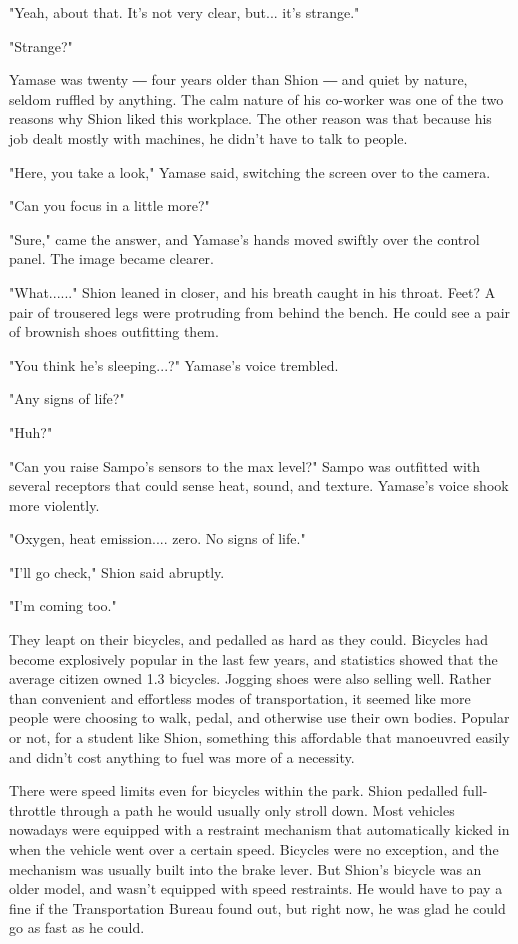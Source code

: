 "Yeah, about that. It's not very clear, but... it's strange."

"Strange?"

Yamase was twenty ― four years older than Shion ― and quiet by nature,
seldom ruffled by anything. The calm nature of his co-worker was one of
the two reasons why Shion liked this workplace. The other reason was
that because his job dealt mostly with machines, he didn't have to talk
to people.

"Here, you take a look," Yamase said, switching the screen over to the
camera.

"Can you focus in a little more?"

"Sure," came the answer, and Yamase's hands moved swiftly over the
control panel. The image became clearer.

"What......" Shion leaned in closer, and his breath caught in his
throat. Feet? A pair of trousered legs were protruding from behind the
bench. He could see a pair of brownish shoes outfitting them.

"You think he's sleeping...?" Yamase's voice trembled.

"Any signs of life?"

"Huh?"

"Can you raise Sampo's sensors to the max level?" Sampo was outfitted
with several receptors that could sense heat, sound, and texture.
Yamase's voice shook more violently.

"Oxygen, heat emission.... zero. No signs of life."

"I'll go check," Shion said abruptly.

"I'm coming too."

They leapt on their bicycles, and pedalled as hard as they could.
Bicycles had become explosively popular in the last few years, and
statistics showed that the average citizen owned 1.3 bicycles. Jogging
shoes were also selling well. Rather than convenient and effortless
modes of transportation, it seemed like more people were choosing to
walk, pedal, and otherwise use their own bodies. Popular or not, for a
student like Shion, something this affordable that manoeuvred easily and
didn't cost anything to fuel was more of a necessity.

There were speed limits even for bicycles within the park. Shion
pedalled full-throttle through a path he would usually only stroll down.
Most vehicles nowadays were equipped with a restraint mechanism that
automatically kicked in when the vehicle went over a certain speed.
Bicycles were no exception, and the mechanism was usually built into the
brake lever. But Shion's bicycle was an older model, and wasn't equipped
with speed restraints. He would have to pay a fine if the Transportation
Bureau found out, but right now, he was glad he could go as fast as he
could.

